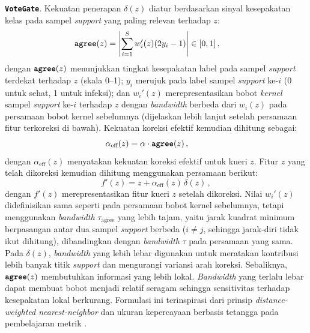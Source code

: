 \documentclass[conference]{IEEEtran}
\newcommand{\nama}[1]{\textbf{\texttt{#1}}}
\newcommand{\myparagraph}[1]{\vspace{0.2cm}\noindent\textbf{#1}.}
\begin{document}
\myparagraph{\nama{VoteGate}} Kekuatan penerapan $\delta(z)$ diatur berdasarkan sinyal kesepakatan kelas pada sampel \textit{support} yang paling relevan terhadap $z$:
\begin{equation}
\nama{agree}(z) = \left\lvert\sum_{i=1}^{S} w_i'(z)(2y_i-1)\right\rvert \in [0,1] \, ,
\tag*{}\label{eq:votegate}
\end{equation}
dengan $\text{\nama{agree}}(z)$ menunjukkan tingkat kesepakatan label pada sampel \textit{support} terdekat terhadap $z$ (skala 0--1); $y_i$ merujuk pada label sampel \textit{support} ke-$i$ (0 untuk sehat, 1 untuk infeksi); dan $w_i'(z)$ merepresentasikan bobot \textit{kernel} sampel \textit{support} ke-$i$ terhadap $z$ dengan \textit{bandwidth} berbeda dari $w_i(z)$ pada persamaan bobot kernel sebelumnya (dijelaskan lebih lanjut setelah persamaan fitur terkoreksi di bawah). Kekuatan koreksi efektif kemudian dihitung sebagai:
\begin{equation}
\alpha_{\text{eff}}(z)=\alpha\cdot\nama{agree}(z) \, ,
\tag*{}\label{eq:alphaeff}
\end{equation}
dengan $\alpha_{\text{eff}}(z)$ menyatakan kekuatan koreksi efektif untuk
kueri $z$. Fitur $z$ yang telah dikoreksi kemudian dihitung menggunakan
persamaan berikut:
\begin{equation}
f'(z)=z+\alpha_{\text{eff}}(z)\,\delta(z) \, ,
\tag*{}\label{eq:votegateapply}
\end{equation}
dengan $f'(z)$ merepresentasikan fitur kueri $z$ setelah dikoreksi. Nilai $w_i'(z)$ didefinisikan sama seperti pada persamaan bobot kernel sebelumnya, tetapi menggunakan \textit{bandwidth} $\tau_{\text{agree}}$ yang lebih tajam, yaitu jarak kuadrat minimum berpasangan antar dua sampel \textit{support} berbeda ($i\neq j$, sehingga jarak-diri tidak ikut dihitung), dibandingkan dengan \textit{bandwidth} $\tau$ pada persamaan yang sama. Pada $\delta(z)$, \textit{bandwidth} yang lebih lebar digunakan untuk meratakan kontribusi lebih banyak titik \textit{support} dan mengurangi variansi arah koreksi. Sebaliknya, $\nama{agree}(z)$ membutuhkan informasi yang lebih lokal. \textit{Bandwidth} yang terlalu lebar dapat membuat bobot menjadi relatif seragam sehingga sensitivitas terhadap kesepakatan lokal berkurang. Formulasi ini terinspirasi dari prinsip \textit{distance-weighted nearest-neighbor} \cite{b20} dan ukuran kepercayaan berbasis tetangga pada pembelajaran metrik \cite{b21}. 
\end{document}

